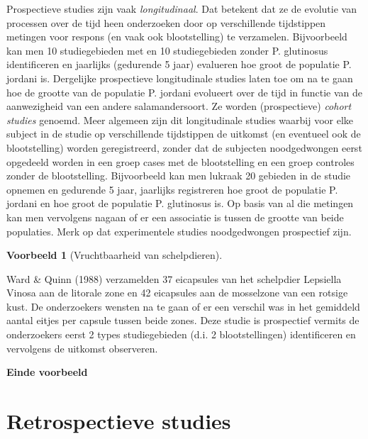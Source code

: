 \documentclass[
  12pt,dutch,coursenotes]{book}
\theoremstyle{definition}
\theoremstyle{definition}
\newtheorem{example}{Voorbeeld}[chapter]
\theoremstyle{definition}
\theoremstyle{remark}
\begin{document}
Prospectieve studies zijn vaak \emph{longitudinaal}. Dat betekent dat ze
de evolutie van processen over de tijd heen onderzoeken door op
verschillende tijdstippen metingen voor respons (en vaak ook blootstelling) te
verzamelen. Bijvoorbeeld kan men 10 studiegebieden met en 10 studiegebieden zonder P. glutinosus identificeren en jaarlijks (gedurende 5 jaar) evalueren hoe groot de populatie P. jordani is. Dergelijke prospectieve longitudinale studies laten toe om na te gaan hoe de grootte van de populatie P. jordani evolueert over de tijd in functie van de aanwezigheid van een andere salamandersoort. Ze
worden (prospectieve) \emph{cohort studies} genoemd. Meer algemeen zijn
dit longitudinale studies waarbij voor elke subject in de studie op
verschillende tijdstippen de uitkomst (en eventueel ook de blootstelling) worden geregistreerd,
zonder dat de subjecten noodgedwongen eerst opgedeeld worden in een groep
cases met de blootstelling en een groep controles zonder de blootstelling.
Bijvoorbeeld kan men lukraak 20 gebieden in de studie
opnemen en gedurende 5 jaar, jaarlijks registreren hoe groot de populatie P. jordani en hoe groot de populatie P. glutinosus is. Op
basis van al die metingen kan men vervolgens nagaan of er een associatie is
tussen de grootte van beide populaties. Merk op dat experimentele studies noodgedwongen prospectief zijn.

\begin{example}[Vruchtbaarheid van schelpdieren]
\protect\hypertarget{exm:unnamed-chunk-85}{}{\label{exm:unnamed-chunk-85} \iffalse (Vruchtbaarheid van schelpdieren) \fi{} }
\end{example}

Ward \& Quinn (1988) verzamelden 37 eicapsules van het schelpdier Lepsiella Vinosa aan de litorale zone en 42 eicapsules aan de mosselzone van een rotsige kust. De onderzoekers wensten na te gaan of er een verschil was in het gemiddeld aantal eitjes per capsule tussen beide zones. Deze studie is prospectief vermits de onderzoekers eerst 2 types studiegebieden (d.i. 2 blootstellingen) identificeren en vervolgens de uitkomst observeren.

\textbf{Einde voorbeeld}

\hypertarget{subsec:design:retro}{%
\section{Retrospectieve studies}\label{subsec:design:retro}}
\end{document}
